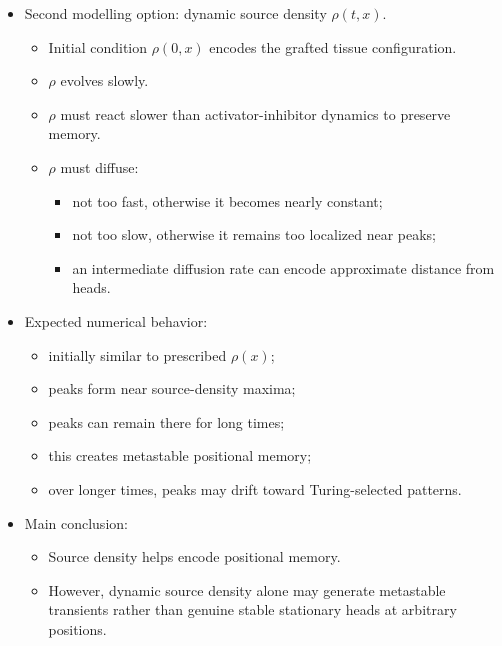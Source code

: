 \begin{itemize}
\begin{itemize}
        \item It represents externally imposed positional information.
        \item Simulate grafted profiles by combining different pieces of \(\rho(x)\).
        \item Wounds are introduced near grafting points.
        \item Peaks can emerge near maxima or discontinuities/transition regions of \(\rho\).
        \item Head positions need not coincide with Turing-selected points.
    \end{itemize}
    \item Second modelling option: dynamic source density \(\rho(t,x)\).
    \begin{itemize}
        \item Initial condition \(\rho(0,x)\) encodes the grafted tissue configuration.
        \item \(\rho\) evolves slowly.
        \item \(\rho\) must react slower than activator-inhibitor dynamics to preserve memory.
        \item \(\rho\) must diffuse:
        \begin{itemize}
            \item not too fast, otherwise it becomes nearly constant;
            \item not too slow, otherwise it remains too localized near peaks;
            \item an intermediate diffusion rate can encode approximate distance from heads.
        \end{itemize}
    \end{itemize}
    \item Expected numerical behavior:
    \begin{itemize}
        \item initially similar to prescribed \(\rho(x)\);
        \item peaks form near source-density maxima;
        \item peaks can remain there for long times;
        \item this creates metastable positional memory;
        \item over longer times, peaks may drift toward Turing-selected patterns.
    \end{itemize}
    \item Main conclusion:
    \begin{itemize}
        \item Source density helps encode positional memory.
        \item However, dynamic source density alone may generate metastable transients rather than genuine stable stationary heads at arbitrary positions.
    \end{itemize}
\end{itemize}
